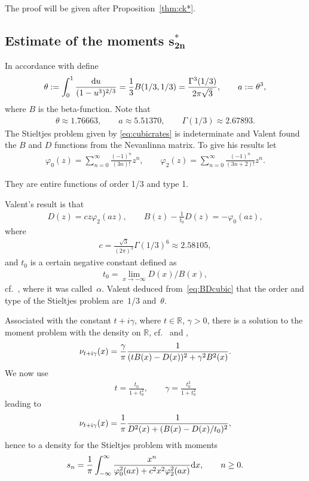 \documentclass[pdftex]{sigma}
\numberwithin{equation}{section}
\begin{document}
The proof will be given after Proposition~\ref{thm:ck*}.

\subsection[Estimate of the moments $s_{2n}^*$]{Estimate of the moments $\boldsymbol{s_{2n}^*}$}
In accordance with \cite{Va98} define
\begin{gather}\label{eq:theta}
\theta:=\int_0^1\frac{{\rm d}u}{(1-u^3)^{2/3}}=\frac13 B(1/3,1/3)=\frac{\Gamma^3(1/3)}{2\pi\sqrt{3}},\qquad a:=\theta^3,
\end{gather}
where $B$ is the beta-function. Note that
\begin{gather*}
 \theta\approx 1.76663,\qquad a\approx 5.51370,\qquad \Gamma(1/3)\approx 2.67893.
\end{gather*}
The Stieltjes problem given by \eqref{eq:cubicrates} is indeterminate and Valent found the $B$ and $D$ functions from the Nevanlinna matrix. To give his results let
\begin{gather*}
\varphi_0(z)=\sum_{n=0}^\infty \frac{(-1)^n}{(3n)!}z^n,\qquad \varphi_2(z)=\sum_{n=0}^\infty \frac{(-1)^n}{(3n+2)!}z^{n}.
\end{gather*}

They are entire functions of order 1/3 and type 1.

Valent's result is that
\begin{gather}\label{eq:BDcubic}
D(z)=c z\varphi_2(az),\qquad B(z)-\frac{1}{t_0}D(z)=-\varphi_0(az),
\end{gather}
where
\begin{gather*}
c=\frac{\sqrt{3}}{(2\pi)^3}\Gamma(1/3)^6\approx 2.58105,
\end{gather*}
and $t_0$ is a certain negative constant defined as
\begin{gather*}
t_0=\lim_{x\to-\infty}D(x)/B(x),
\end{gather*}
cf.~\cite[Lemma~2.2.1]{B:V}, where it was called~$\alpha$. Valent deduced from~\eqref{eq:BDcubic} that the order and type of the Stieltjes problem are~$1/3$ and~$\theta$.

Associated with the constant $t+i\gamma$, where $t\in\mathbb{R}$, $\gamma>0$, there is a solution to the moment problem with the density on $\mathbb{R}$, cf.~\cite{B:C} and \cite[equation~(2.17)]{B:V},
\begin{gather*}
\nu_{t+{\rm i}\gamma}(x)=\frac{\gamma}{\pi}\frac{1}{(tB(x)-D(x))^2+\gamma^2B^2(x)}.
\end{gather*}
We now use
\begin{gather*}
t=\frac{t_0}{1+t_0^2},\qquad \gamma=\frac{t_0^2}{1+t_0^2}
\end{gather*}
leading to
\begin{gather*}
\nu_{t+{\rm i}\gamma}(x)=\frac{1}{\pi}\frac{1}{D^2(x)+(B(x)-D(x)/t_0)^2},
\end{gather*}
hence to a density for the Stieltjes problem with moments
\begin{gather*}
s_n=\frac{1}{\pi}\int_{-\infty}^\infty \frac{x^n}{\varphi_0^2(ax)+c^2 x^2\varphi_2^2(ax)}{\rm d}x,\qquad n\ge 0.
\end{gather*}
\end{document}
